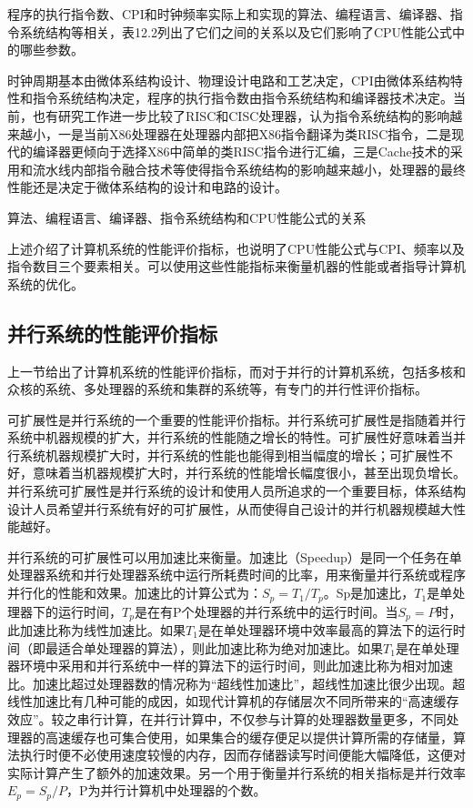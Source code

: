 \documentclass[]{ctexbook}
\begin{document}
程序的执行指令数、CPI和时钟频率实际上和实现的算法、编程语言、编译器、指令系统结构等相关，表12.2列出了它们之间的关系以及它们影响了CPU性能公式中的哪些参数。

时钟周期基本由微体系结构设计、物理设计电路和工艺决定，CPI由微体系结构特性和指令系统结构决定，程序的执行指令数由指令系统结构和编译器技术决定。当前，也有研究工作进一步比较了RISC和CISC处理器，认为指令系统结构的影响越来越小，一是当前X86处理器在处理器内部把X86指令翻译为类RISC指令，二是现代的编译器更倾向于选择X86中简单的类RISC指令进行汇编，三是Cache技术的采用和流水线内部指令融合技术等使得指令系统结构的影响越来越小，处理器的最终性能还是决定于微体系结构的设计和电路的设计。

\label{tab:performance-formula}算法、编程语言、编译器、指令系统结构和CPU性能公式的关系

上述介绍了计算机系统的性能评价指标，也说明了CPU性能公式与CPI、频率以及指令数目三个要素相关。可以使用这些性能指标来衡量机器的性能或者指导计算机系统的优化。

\hypertarget{ux5e76ux884cux7cfbux7edfux7684ux6027ux80fdux8bc4ux4ef7ux6307ux6807}{%
\subsection{并行系统的性能评价指标}\label{ux5e76ux884cux7cfbux7edfux7684ux6027ux80fdux8bc4ux4ef7ux6307ux6807}}

上一节给出了计算机系统的性能评价指标，而对于并行的计算机系统，包括多核和众核的系统、多处理器的系统和集群的系统等，有专门的并行性评价指标。

可扩展性是并行系统的一个重要的性能评价指标。并行系统可扩展性是指随着并行系统中机器规模的扩大，并行系统的性能随之增长的特性。可扩展性好意味着当并行系统机器规模扩大时，并行系统的性能也能得到相当幅度的增长；可扩展性不好，意味着当机器规模扩大时，并行系统的性能增长幅度很小，甚至出现负增长。并行系统可扩展性是并行系统的设计和使用人员所追求的一个重要目标，体系结构设计人员希望并行系统有好的可扩展性，从而使得自己设计的并行机器规模越大性能越好。

并行系统的可扩展性可以用加速比来衡量。加速比（Speedup）是同一个任务在单处理器系统和并行处理器系统中运行所耗费时间的比率，用来衡量并行系统或程序并行化的性能和效果。加速比的计算公式为：\(S_p=T_1/T_p\)。Sp是加速比，\(T_1\)是单处理器下的运行时间，\(T_p\)是在有P个处理器的并行系统中的运行时间。当\(S_p=P\)时，此加速比称为线性加速比。如果\(T_1\)是在单处理器环境中效率最高的算法下的运行时间（即最适合单处理器的算法），则此加速比称为绝对加速比。如果\(T_1\)是在单处理器环境中采用和并行系统中一样的算法下的运行时间，则此加速比称为相对加速比。加速比超过处理器数的情况称为``超线性加速比''，超线性加速比很少出现。超线性加速比有几种可能的成因，如现代计算机的存储层次不同所带来的``高速缓存效应''。较之串行计算，在并行计算中，不仅参与计算的处理器数量更多，不同处理器的高速缓存也可集合使用，如果集合的缓存便足以提供计算所需的存储量，算法执行时便不必使用速度较慢的内存，因而存储器读写时间便能大幅降低，这便对实际计算产生了额外的加速效果。另一个用于衡量并行系统的相关指标是并行效率\(E_p=S_p/P\)，P为并行计算机中处理器的个数。
\end{document}
